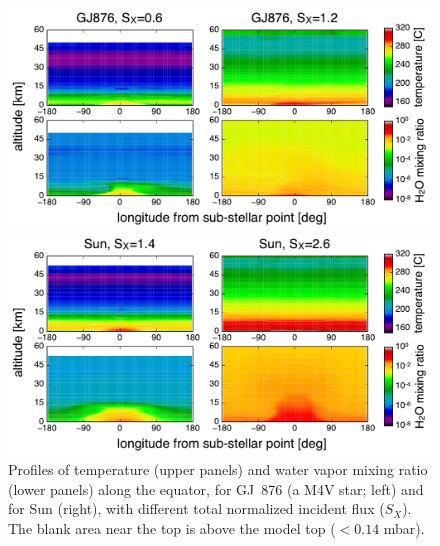 \documentclass[11pt,numberedappendix,twocolappendix,]{emulateapj}
\def\wv{water vapor}
\begin{document}
\begin{figure}[t]
    \begin{minipage}{0.5\hsize}
\includegraphics[width=\hsize]{AqOH0TLS_GJ876_temp_xH2O.pdf}
    \end{minipage}
    \begin{minipage}{0.5\hsize}
\includegraphics[width=\hsize]{AqOH0TLS_Sun_temp_xH2O_ver2.pdf}
    \end{minipage}
    \caption{Profiles of temperature (upper panels) and \wv{} mixing ratio (lower panels) along the equator, for GJ~876 (a M4V star; left) and for Sun (right), with different total normalized incident flux ($S_X$). The blank area near the top is above the model top ($< 0.14$ mbar).}
\label{fig:3Dprofile_equator}
\end{figure}
\end{document}
